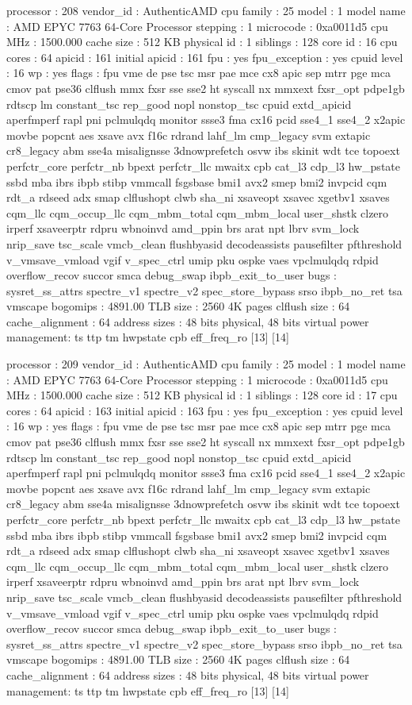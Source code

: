 processor	: 208
vendor_id	: AuthenticAMD
cpu family	: 25
model		: 1
model name	: AMD EPYC 7763 64-Core Processor
stepping	: 1
microcode	: 0xa0011d5
cpu MHz		: 1500.000
cache size	: 512 KB
physical id	: 1
siblings	: 128
core id		: 16
cpu cores	: 64
apicid		: 161
initial apicid	: 161
fpu		: yes
fpu_exception	: yes
cpuid level	: 16
wp		: yes
flags		: fpu vme de pse tsc msr pae mce cx8 apic sep mtrr pge mca cmov pat pse36 clflush mmx fxsr sse sse2 ht syscall nx mmxext fxsr_opt pdpe1gb rdtscp lm constant_tsc rep_good nopl nonstop_tsc cpuid extd_apicid aperfmperf rapl pni pclmulqdq monitor ssse3 fma cx16 pcid sse4_1 sse4_2 x2apic movbe popcnt aes xsave avx f16c rdrand lahf_lm cmp_legacy svm extapic cr8_legacy abm sse4a misalignsse 3dnowprefetch osvw ibs skinit wdt tce topoext perfctr_core perfctr_nb bpext perfctr_llc mwaitx cpb cat_l3 cdp_l3 hw_pstate ssbd mba ibrs ibpb stibp vmmcall fsgsbase bmi1 avx2 smep bmi2 invpcid cqm rdt_a rdseed adx smap clflushopt clwb sha_ni xsaveopt xsavec xgetbv1 xsaves cqm_llc cqm_occup_llc cqm_mbm_total cqm_mbm_local user_shstk clzero irperf xsaveerptr rdpru wbnoinvd amd_ppin brs arat npt lbrv svm_lock nrip_save tsc_scale vmcb_clean flushbyasid decodeassists pausefilter pfthreshold v_vmsave_vmload vgif v_spec_ctrl umip pku ospke vaes vpclmulqdq rdpid overflow_recov succor smca debug_swap ibpb_exit_to_user
bugs		: sysret_ss_attrs spectre_v1 spectre_v2 spec_store_bypass srso ibpb_no_ret tsa vmscape
bogomips	: 4891.00
TLB size	: 2560 4K pages
clflush size	: 64
cache_alignment	: 64
address sizes	: 48 bits physical, 48 bits virtual
power management: ts ttp tm hwpstate cpb eff_freq_ro [13] [14]

processor	: 209
vendor_id	: AuthenticAMD
cpu family	: 25
model		: 1
model name	: AMD EPYC 7763 64-Core Processor
stepping	: 1
microcode	: 0xa0011d5
cpu MHz		: 1500.000
cache size	: 512 KB
physical id	: 1
siblings	: 128
core id		: 17
cpu cores	: 64
apicid		: 163
initial apicid	: 163
fpu		: yes
fpu_exception	: yes
cpuid level	: 16
wp		: yes
flags		: fpu vme de pse tsc msr pae mce cx8 apic sep mtrr pge mca cmov pat pse36 clflush mmx fxsr sse sse2 ht syscall nx mmxext fxsr_opt pdpe1gb rdtscp lm constant_tsc rep_good nopl nonstop_tsc cpuid extd_apicid aperfmperf rapl pni pclmulqdq monitor ssse3 fma cx16 pcid sse4_1 sse4_2 x2apic movbe popcnt aes xsave avx f16c rdrand lahf_lm cmp_legacy svm extapic cr8_legacy abm sse4a misalignsse 3dnowprefetch osvw ibs skinit wdt tce topoext perfctr_core perfctr_nb bpext perfctr_llc mwaitx cpb cat_l3 cdp_l3 hw_pstate ssbd mba ibrs ibpb stibp vmmcall fsgsbase bmi1 avx2 smep bmi2 invpcid cqm rdt_a rdseed adx smap clflushopt clwb sha_ni xsaveopt xsavec xgetbv1 xsaves cqm_llc cqm_occup_llc cqm_mbm_total cqm_mbm_local user_shstk clzero irperf xsaveerptr rdpru wbnoinvd amd_ppin brs arat npt lbrv svm_lock nrip_save tsc_scale vmcb_clean flushbyasid decodeassists pausefilter pfthreshold v_vmsave_vmload vgif v_spec_ctrl umip pku ospke vaes vpclmulqdq rdpid overflow_recov succor smca debug_swap ibpb_exit_to_user
bugs		: sysret_ss_attrs spectre_v1 spectre_v2 spec_store_bypass srso ibpb_no_ret tsa vmscape
bogomips	: 4891.00
TLB size	: 2560 4K pages
clflush size	: 64
cache_alignment	: 64
address sizes	: 48 bits physical, 48 bits virtual
power management: ts ttp tm hwpstate cpb eff_freq_ro [13] [14]

